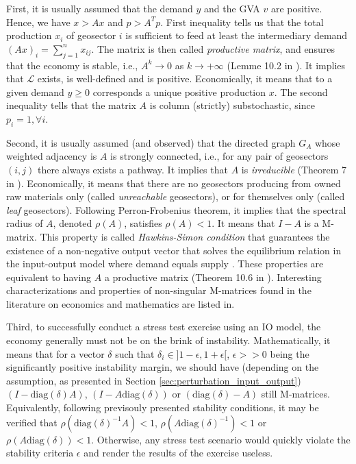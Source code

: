 \documentclass{article}
\begin{document}
\vspace{0.1cm}

First, it is usually assumed that the demand $y$ and the GVA $v$ are positive. Hence, we have $x > Ax$ and $p > A^Tp$. First inequality tells us that the total production $x_i$ of geosector $i$ is sufficient to feed at least the intermediary demand $(Ax)_i = \sum_{j=1}^n x_{ij}$. The matrix is then called \textit{productive matrix}, and ensures that the economy is stable, i.e., $A^k \rightarrow 0$ as $k \rightarrow +\infty$ (Lemme 10.2 in \cite{ersel2011linear}). It implies that $\mathcal{L}$ exists, is well-defined and is positive. Economically, it means that to a given demand $y \geq 0$ corresponds a unique positive production $x$. The second inequality tells that the matrix $A$ is column (strictly) substochastic, since $p_i=1, \forall i$.

\vspace{0.1cm}

Second, it is usually assumed (and observed) that the directed graph $G_A$ whose weighted adjacency is $A$ is strongly connected, i.e., for any pair of geosectors $(i,j)$ there always exists a pathway. It implies that $A$ is \textit{irreducible} (Theorem 7 in \cite{giorgi2019nonnegative}). Economically, it means that there are no geosectors producing from owned raw materials only (called \textit{unreachable} geosectors), or for themselves only (called \textit{leaf} geosectors). Following Perron-Frobenius theorem, it implies that the spectral radius of $A$, denoted $\rho(A)$, satisfies $\rho(A) < 1$. It means that $I-A$ is a M-matrix. This property is called \textit{Hawkins-Simon condition} that guarantees the existence of a non-negative output vector that solves the equilibrium relation in the input-output model where demand equals supply \cite{carlos2024existence}. These properties are equivalent to having $A$ a productive matrix (Theorem 10.6 in \cite{ersel2011linear}).
Interesting characterizations and properties of non-singular M-matrices found in the literature on economics and mathematics are listed in\cite{plemmons1977m}. 

\vspace{0.1cm}

Third, to successfully conduct a stress test exercise using an IO model, the economy generally must not be on the brink of instability. Mathematically, it means that for a vector $\delta$ such that $\delta_i \in ]1-\epsilon, 1+\epsilon[$, $\epsilon >> 0$ being the significantly positive instability margin, we should have (depending on the assumption, as presented in Section \ref{sec:perturbation_input_output}) $(I-\text{diag}(\delta)A)$, $(I-A\text{diag}(\delta))$ or $(\text{diag}(\delta) - A)$ still M-matrices. Equivalently, following previsouly presented stability conditions, it may be verified that $\rho(\text{diag}(\delta)^{-1}A) < 1$, $\rho(A\text{diag}(\delta)^{-1}) < 1$ or $\rho(A\text{diag}(\delta)) < 1$. Otherwise, any stress test scenario would quickly violate the stability criteria $\epsilon$ and render the results of the exercise useless.
\end{document}
